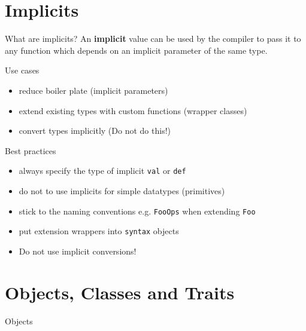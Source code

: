 \documentclass[10pt]{beamer}
\begin{document}
  \section{Implicits}
  \begin{frame}{What are implicits?}
    An \textbf{implicit} value can be used by the compiler to pass it to any
    function which depends on an implicit parameter of the same type.
  \end{frame}

  \begin{frame}{Use cases}
    \begin{itemize}
      \item reduce boiler plate (implicit parameters)
      \item extend existing types with custom functions (wrapper classes)
      \item convert types implicitly (\alert{Do not do this!})
    \end{itemize}
  \end{frame}

  \begin{frame}{Best practices}
    \begin{itemize}
      \item always specify the type of implicit \texttt{val} or \texttt{def}
      \item do not to use implicits for simple datatypes (primitives)
      \item stick to the naming conventions e.g. \texttt{FooOps} when extending \texttt{Foo}
      \item put extension wrappers into \texttt{syntax} objects
      \item \alert{Do not use implicit conversions!}
    \end{itemize}
  \end{frame}

  \section{Objects, Classes and Traits}
  \begin{frame}{Objects}
  \end{frame}
\end{document}
